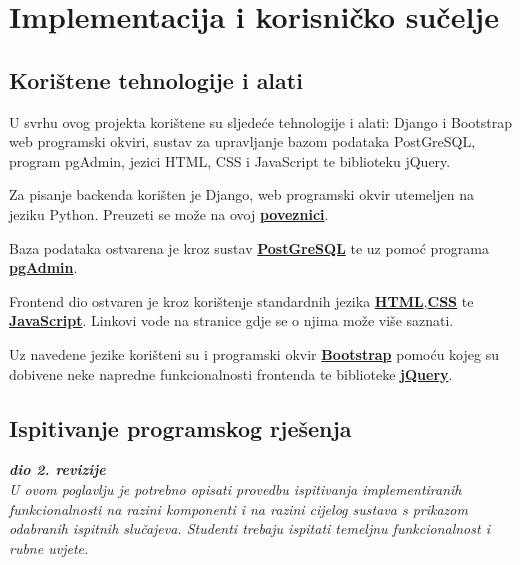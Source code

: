 \chapter{Implementacija i korisničko sučelje}
		
		
		\section{Korištene tehnologije i alati}
		
			 U svrhu ovog projekta korištene su sljedeće tehnologije i alati: Django i Bootstrap web programski okviri, sustav za upravljanje bazom podataka PostGreSQL, program pgAdmin, jezici HTML, CSS i JavaScript te biblioteku jQuery. \\
			 
			 
			 {Za pisanje backenda korišten je Django, web programski okvir utemeljen na jeziku Python. Preuzeti se može na ovoj  \href{https://www.djangoproject.com/}{\textbf{poveznici}}.
			 	
			 Baza podataka ostvarena je kroz sustav \href{https://www.postgresql.org/}{\textbf{PostGreSQL}} te uz pomoć programa \href{https://www.pgadmin.org/}{\textbf{pgAdmin}}.
			 
			 Frontend dio ostvaren je kroz korištenje standardnih jezika \href{https://www.w3schools.com/html/}{\textbf{HTML}},\href{https://www.w3schools.com/css/}{\textbf{CSS}} te \href{https://www.w3schools.com/js/DEFAULT.asp}{\textbf{JavaScript}}. Linkovi vode na stranice gdje se o njima može više saznati. 
			 
			 Uz navedene jezike korišteni su i programski okvir \href{https://getbootstrap.com/}{\textbf{Bootstrap}} pomoću kojeg su dobivene neke napredne funkcionalnosti frontenda te biblioteke \href{https://jquery.com/}{\textbf{jQuery}}.
			
			
			\eject 
		
	
		\section{Ispitivanje programskog rješenja}
			
			\textbf{\textit{dio 2. revizije}}\\
			
			 \textit{U ovom poglavlju je potrebno opisati provedbu ispitivanja implementiranih funkcionalnosti na razini komponenti i na razini cijelog sustava s prikazom odabranih ispitnih slučajeva. Studenti trebaju ispitati temeljnu funkcionalnost i rubne uvjete.}
	
}
